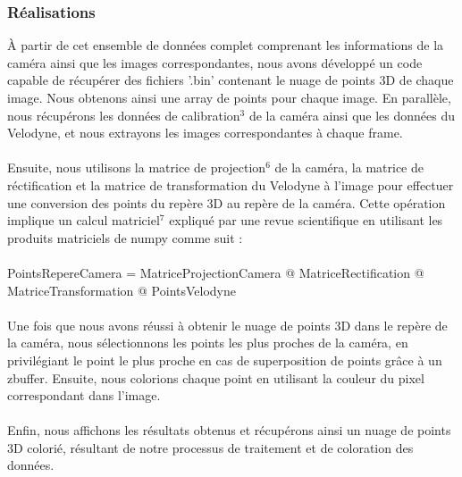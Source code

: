     \subsubsection{Réalisations}
        \normalsize{
            À partir de cet ensemble de données complet comprenant les informations de la caméra ainsi que les images correspondantes, nous avons développé un code capable de récupérer des fichiers '.bin' contenant le nuage de points 3D de chaque image. Nous obtenons ainsi une array de points pour chaque image. En parallèle, nous récupérons les données de calibration$^3$ de la caméra ainsi que les données du Velodyne, et nous extrayons les images correspondantes à chaque frame.
        }
        \\ \\
        \normalsize{
            Ensuite, nous utilisons la matrice de projection$^6$ de la caméra, la matrice de réctification et la matrice de transformation du Velodyne à l'image pour effectuer une conversion des points du repère 3D au repère de la caméra. Cette opération implique un calcul matriciel$^7$ expliqué par une revue scientifique \cite{Geiger2013IJRR} en utilisant les produits matriciels de numpy comme suit :
        }
        \\ \\
        \normalsize{
            PointsRepereCamera = MatriceProjectionCamera @ MatriceRectification @ MatriceTransformation @ PointsVelodyne
        }
        \\ \\
        \normalsize{
            Une fois que nous avons réussi à obtenir le nuage de points 3D dans le repère de la caméra, nous sélectionnons les points les plus proches de la caméra, en privilégiant le point le plus proche en cas de superposition de points grâce à un zbuffer. Ensuite, nous colorions chaque point en utilisant la couleur du pixel correspondant dans l'image.
        }
        \\ \\
        \normalsize{
            Enfin, nous affichons les résultats obtenus et récupérons ainsi un nuage de points 3D colorié, résultant de notre processus de traitement et de coloration des données.
        }

